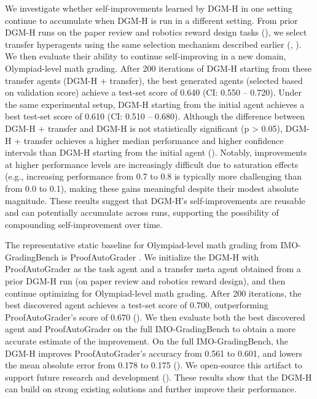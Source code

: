 \documentclass[]{fairmeta}
\begin{document}
We investigate whether self-improvements learned by DGM-H in one setting continue to accumulate when DGM-H is run in a different setting. From prior DGM-H runs on the paper review and robotics reward design tasks (), we select transfer hyperagents using the same selection mechanism described earlier (, ). We then evaluate their ability to continue self-improving in a new domain, Olympiad-level math grading. After 200 iterations of DGM-H starting from these transfer agents (DGM-H + transfer), the best generated agents (selected based on validation score) achieve a test-set score of 0.640 (CI: 0.550 -- 0.720). Under the same experimental setup, DGM-H starting from the initial agent achieves a best test-set score of 0.610 (CI: 0.510 -- 0.680). Although the difference between DGM-H + transfer and DGM-H is not statistically significant (p > 0.05), DGM-H + transfer achieves a higher median performance and higher confidence intervals than DGM-H starting from the initial agent (). Notably, improvements at higher performance levels are increasingly difficult due to saturation effects (e.g., increasing performance from 0.7 to 0.8 is typically more challenging than from 0.0 to 0.1), making these gains meaningful despite their modest absolute magnitude. These results suggest that DGM-H's self-improvements are reusable and can potentially accumulate across runs, supporting the possibility of compounding self-improvement over time.

The representative static baseline for Olympiad-level math grading from IMO-GradingBench is ProofAutoGrader \citep{luong2025towards}. We initialize the DGM-H with ProofAutoGrader as the task agent and a transfer meta agent obtained from a prior DGM-H run (on paper review and robotics reward design), and then continue optimizing for Olympiad-level math grading. After 200 iterations, the best discovered agent achieves a test-set score of 0.700, outperforming ProofAutoGrader's score of 0.670 (). We then evaluate both the best discovered agent and ProofAutoGrader on the full IMO-GradingBench to obtain a more accurate estimate of the improvement. On the full IMO-GradingBench, the DGM-H improves ProofAutoGrader's accuracy from 0.561 to 0.601, and lowers the mean absolute error from 0.178 to 0.175 (). We open-source this artifact to support future research and development (). These results show that the DGM-H can build on strong existing solutions and further improve their performance.
\end{document}
